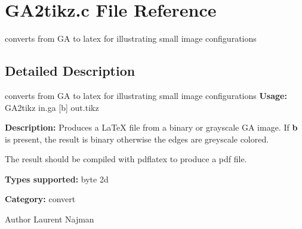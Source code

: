 \section{GA2tikz.c File Reference}
\label{GA2tikz_8c}


converts from GA to latex for illustrating small image configurations  




\subsection{Detailed Description}
converts from GA to latex for illustrating small image configurations {\bfseries Usage:} GA2tikz in.ga [b] out.tikz

{\bfseries Description:} Produces a LaTeX file from a binary or grayscale GA image. If {\bfseries b} is present, the result is binary otherwise the edges are greyscale colored.

The result should be compiled with pdflatex to produce a pdf file.

{\bfseries Types supported:} byte 2d

{\bfseries Category:} convert

\begin{DoxyAuthor}{Author}
Laurent Najman 
\end{DoxyAuthor}
